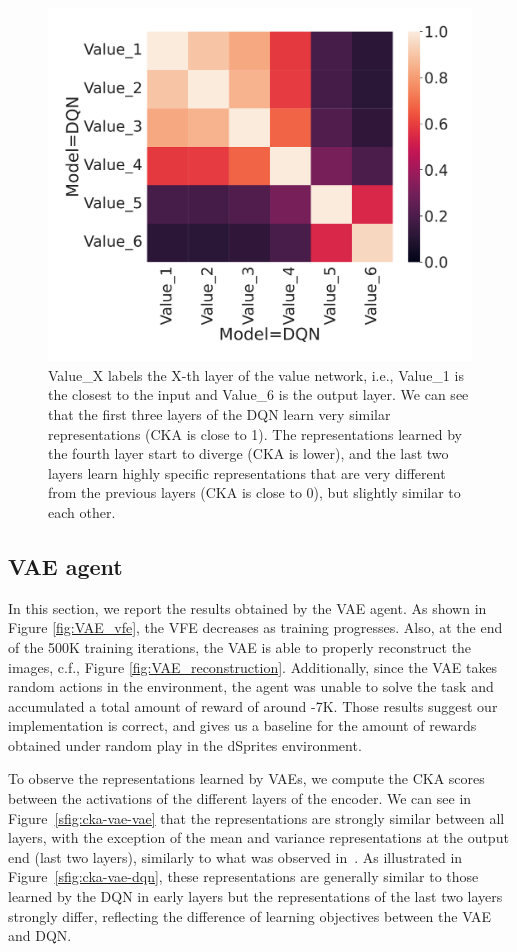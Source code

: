\documentclass[twoside,11pt]{article}
\begin{document}
\begin{figure}[H]
    \centering
    \includegraphics[width=0.5\linewidth]{cka_figures/CKA_dqn_1_dqn_1}
    \caption{Value\_X labels the X-th layer of the value network, i.e., Value\_1 is the closest to the input and Value\_6 is the output layer. We can see that the first three layers of the DQN learn very similar representations (CKA is close to 1). The representations learned by the fourth layer start to diverge (CKA is lower), and the last two layers learn highly specific representations that are very different from the previous layers (CKA is close to 0), but slightly similar to each other.}\label{fig:cka-dqn}
\end{figure}

\subsection{VAE agent} \label{ssec:vae_results}

In this section, we report the results obtained by the VAE agent. As shown in Figure \ref{fig:VAE_vfe}, the VFE decreases as training progresses. Also, at the end of the 500K training iterations, the VAE is able to properly reconstruct the  images, c.f., Figure \ref{fig:VAE_reconstruction}. Additionally, since the VAE takes random actions in the environment, the agent was unable to solve the task and accumulated a total amount of reward of around -7K. Those results suggest our implementation is correct, and gives us a baseline for the amount of rewards obtained under random play in the dSprites environment.

To observe the representations learned by VAEs, we compute the CKA scores between the activations of the different layers of the encoder. We can see in Figure~\ref{sfig:cka-vae-vae} that the representations are strongly similar between all layers, with the exception of the mean and variance representations at the output end (last two layers), similarly to what was observed in~\citet{Bonheme2022}. As illustrated in Figure~\ref{sfig:cka-vae-dqn}, these representations are generally similar to those learned by the DQN in early layers but the representations of the last two layers strongly differ, reflecting the difference of learning objectives between the VAE and DQN.
\end{document}
